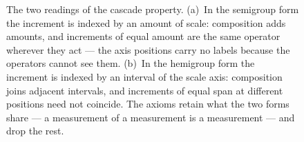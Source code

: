 \begin{figure}[t]
\begin{tikzpicture}[every node/.style={font=\small}, line cap=round]
\end{tikzpicture}
\caption{The two readings of the cascade property. (a)~In the semigroup form the
increment is indexed by an amount of scale: composition adds amounts, and increments of
equal amount are the same operator wherever they act --- the axis positions carry no
labels because the operators cannot see them. (b)~In the hemigroup form the increment is
indexed by an interval of the scale axis: composition joins adjacent intervals, and
increments of equal span at different positions need not coincide. The axioms retain what
the two forms share --- a measurement of a measurement is a measurement --- and drop the
rest.}
\label{fig:cascade}
\end{figure}
